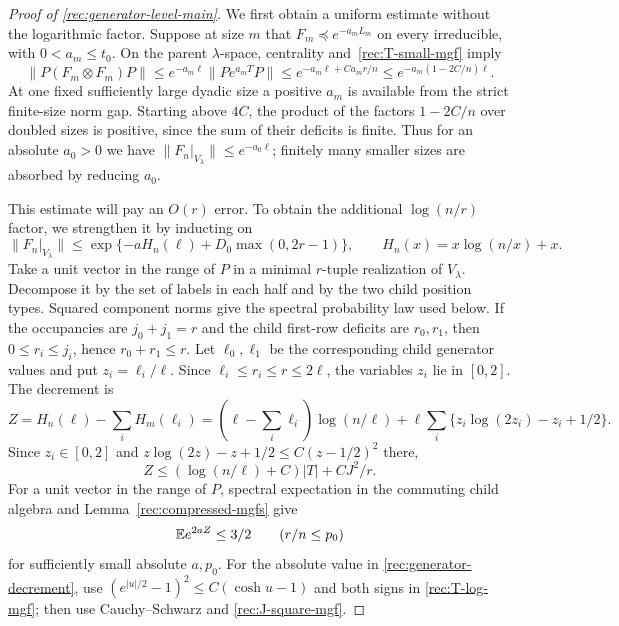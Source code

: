 \begin{proof}[Proof of \eqref{rec:generator-level-main}]
We first obtain a uniform estimate without the logarithmic factor.
Suppose at size $m$ that $F_m\preceq e^{-a_m L_m}$ on every
irreducible, with $0<a_m\le t_0$.  On the parent $\lambda$-space,
centrality and~\eqref{rec:T-small-mgf} imply
\[
 \|P(F_m\otimes F_m)P\|
 \le e^{-a_m\ell}\|Pe^{a_mT}P\|
 \le e^{-a_m\ell+Ca_mr/n}
 \le e^{-a_m(1-2C/n)\ell}.
\]
At one fixed sufficiently large dyadic size a positive $a_m$ is
available from the strict finite-size norm gap.  Starting above $4C$,
the product of the factors $1-2C/n$ over doubled sizes is positive,
since the sum of their deficits is finite.  Thus for an absolute
$a_0>0$ we have $\|F_n|_{V_\lambda}\|\le e^{-a_0\ell}$;
finitely many smaller sizes are absorbed by reducing $a_0$.

This estimate will pay an $O(r)$ error.  To obtain the additional
$\log(n/r)$ factor, we strengthen it by inducting on
\begin{equation}\label{rec:generator-penalty-induction}
 \|F_n|_{V_\lambda}\|
 \le\exp\{-aH_n(\ell)+D_0\max(0,2r-1)\},
 \qquad H_n(x)=x\log(n/x)+x.
\end{equation}
Take a unit vector in the range of $P$ in a minimal $r$-tuple
realization of $V_\lambda$.  Decompose it by the set of labels in each
half and by the two child position types.  Squared component norms give
the spectral probability law used below.  If the occupancies are
$j_0+j_1=r$ and the child first-row deficits are $r_0,r_1$, then
$0\le r_i\le j_i$, hence $r_0+r_1\le r$.  Let $\ell_0,\ell_1$
be the corresponding child generator values and put
$z_i=\ell_i/\ell$.  Since $\ell_i\le r_i\le r\le2\ell$, the
variables $z_i$ lie in $[0,2]$.  The decrement is
\[
 Z=H_n(\ell)-\sum_iH_m(\ell_i)
 =\left(\ell-\sum_i\ell_i\right)\log(n/\ell)
 +\ell\sum_i\{z_i\log(2z_i)-z_i+1/2\}.
\]
Since $z_i\in[0,2]$ and
$z\log(2z)-z+1/2\le C(z-1/2)^2$ there,
\begin{equation}\label{rec:generator-decrement}
 Z\le(\log(n/\ell)+C)|T|+CJ^2/r.
\end{equation}
For a unit vector in the range of $P$, spectral expectation in the
commuting child algebra and Lemma~\ref{rec:compressed-mgfs} give
\begin{equation}\label{rec:generator-slack}
 \mathbb E e^{2aZ}\le3/2\qquad(r/n\le p_0)
\end{equation}
for sufficiently small absolute $a,p_0$.  For the absolute value in
\eqref{rec:generator-decrement}, use
$(e^{|u|/2}-1)^2\le C(\cosh u-1)$ and both signs in
\eqref{rec:T-log-mgf}; then use Cauchy--Schwarz and
\eqref{rec:J-square-mgf}.


\end{proof}
